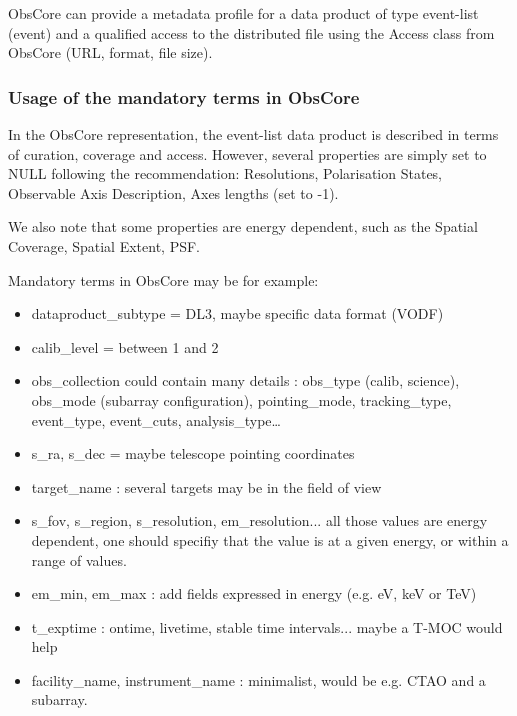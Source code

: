 \documentclass[11pt,a4paper]{ivoa}
\begin{document}
{%
%


ObsCore \citep{2017ivoa.spec.0509L} can provide a metadata profile for a data product of type event-list (event) and a qualified access to the distributed file using the Access class from ObsCore (URL, format, file size).

\subsubsection{Usage of the mandatory terms in ObsCore}

In the ObsCore representation, the event-list data product is described in terms of curation, coverage and access. However, several properties are simply set to NULL following the recommendation: Resolutions, Polarisation States, Observable Axis Description, Axes lengths (set to -1).

We also note that some properties are energy dependent, such as the Spatial Coverage, Spatial Extent, \gls{PSF}.


Mandatory terms in ObsCore may be for example:

\begin{itemize}
    \item dataproduct\_subtype = DL3, maybe specific data format (\gls{VODF})
    \item calib\_level = between 1 and 2
    \item obs\_collection could contain many details : obs\_type (calib, science), obs\_mode (subarray
configuration), pointing\_mode, tracking\_type, event\_type, event\_cuts, analysis\_type…
    \item s\_ra, s\_dec = maybe telescope pointing coordinates
    \item target\_name : several targets may be in the field of view
    \item s\_fov, s\_region, s\_resolution, em\_resolution... all those values are energy dependent, one should specifiy that the value is at a given energy, or within a range of values.
    \item em\_min, em\_max : add fields expressed in energy (e.g. eV, keV or TeV)
    \item t\_exptime : ontime, livetime, stable time intervals... maybe a T-MOC would help
    \item facility\_name, instrument\_name : minimalist, would be e.g. \gls{CTAO} and a subarray.
\end{itemize}


}
\end{document}
